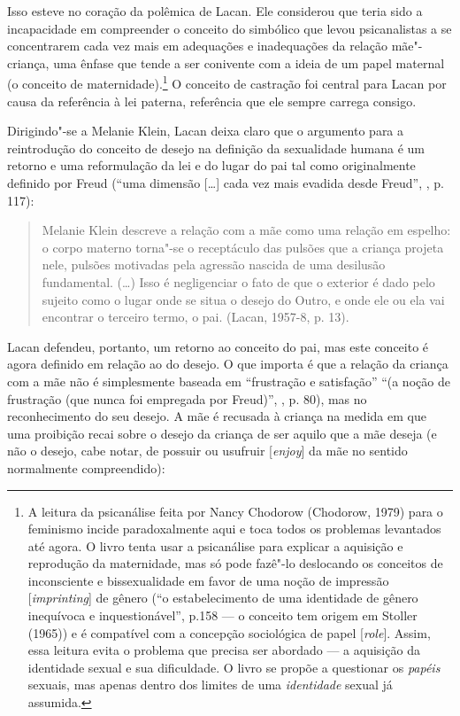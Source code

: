 Isso esteve no coração da polêmica de Lacan. Ele considerou que teria
sido a incapacidade em compreender o conceito do simbólico que levou
psicanalistas a se concentrarem cada vez mais em adequações e
inadequações da relação mãe"-criança, uma ênfase que tende a ser
conivente com a ideia de um papel maternal (o conceito de
maternidade).\footnote{A leitura da psicanálise feita por Nancy Chodorow
  (Chodorow, 1979) para o feminismo incide paradoxalmente aqui e toca
  todos os problemas levantados até agora. O livro tenta usar a
  psicanálise para explicar a aquisição e reprodução da maternidade, mas
  só pode fazê"-lo deslocando os conceitos de inconsciente e
  bissexualidade em favor de uma noção de impressão
  {[}\emph{imprinting}{]} de gênero (``o estabelecimento de uma
  identidade de gênero inequívoca e inquestionável'', p.158 --- o
  conceito tem origem em Stoller (1965)) e é compatível com a concepção
  sociológica de papel {[}\emph{role}{]}. Assim, essa leitura evita o
  problema que precisa ser abordado --- a aquisição da identidade sexual
  e sua dificuldade. O livro se propõe a questionar os \emph{papéis}
  sexuais, mas apenas dentro dos limites de uma \emph{identidade} sexual
  já assumida.} O conceito de castração foi central para Lacan por
causa da referência à lei paterna, referência que ele sempre carrega
consigo.

Dirigindo"-se a Melanie Klein, Lacan deixa claro que o argumento para a
reintrodução do conceito de desejo na definição da sexualidade humana é
um retorno e uma reformulação da lei e do lugar do pai tal como
originalmente definido por Freud (``uma dimensão {[}\ldots{}{]} cada vez mais
evadida desde Freud'', , p. 117):

\begin{quote}
Melanie Klein descreve a relação com a mãe como uma relação em espelho:
o corpo materno torna"-se o receptáculo das pulsões que a criança projeta
nele, pulsões motivadas pela agressão nascida de uma desilusão
fundamental. (\ldots{}) Isso é negligenciar o fato de que o exterior é dado
pelo sujeito como o lugar onde se situa o desejo do Outro, e onde ele ou
ela vai encontrar o terceiro termo, o pai. (Lacan, 1957-8, p. 13).
\end{quote}

Lacan defendeu, portanto, um retorno ao conceito do pai, mas este
conceito é agora definido em relação ao do desejo. O que importa é que a
relação da criança com a mãe não é simplesmente baseada em ``frustração e
satisfação'' ``(a noção de frustração (que nunca foi empregada por %
Freud)'', , p. 80), mas no reconhecimento do seu desejo. A mãe é
recusada à criança na medida em que uma proibição recai sobre o desejo
da criança de ser aquilo que a mãe deseja (e não o desejo, cabe notar,
de possuir ou usufruir {[}\emph{enjoy}{]} da mãe no sentido normalmente
compreendido):

